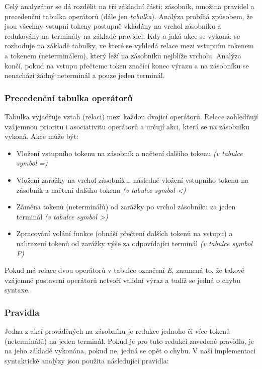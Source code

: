 \documentclass[a4paper,11pt]{article}
\begin{document}
Celý analyzátor se dá rozdělit na tři základní části: zásobník, množina pravidel a precedenční tabulka operátorů (dále jen \textit{tabulka}). Analýza probíhá způsobem, že jsou všechny vstupní tokeny postupně vkládány na vrchol zásobníku a redukovány na terminály na základě pravidel. Kdy a jaká akce se vykoná, se rozhoduje na základě tabulky, ve které se vyhledá relace mezi vstupním tokenem a tokenem (neterminálem), který leží na zásobníku nejblíže vrcholu. Analýza končí, pokud na vstupu přečteme token značící konec výrazu a na zásobníku se nenachází žádný neterminál a pouze jeden terminál.

\subsubsection{Precedenční tabulka operátorů}
Tabulka vyjadřuje vztah (relaci) mezi každou dvojicí operátorů. Relace zohledňují vzájemnou prioritu i asociativitu operátorů a určují akci, která se na zásobníku vykoná. Akce může být: 
\begin{itemize}
   \item Vložení vstupního tokenu na zásobník a načtení dalšího tokenu \textit{(v tabulce symbol =)}
   \item Vložení zarážky na vrchol zásobníku, následné vložení vstupního tokenu na zásobník a načtení dalšího tokenu \textit{(v tabulce symbol \textless)}
   \item Záměna tokenů (neterminálů) od zarážky po vrchol zásobníku za jeden terminál \textit{(v tabulce symbol \textgreater)}
   \item Zpracování volání funkce (obnáší přečtení dalších tokenů na vstupu) a nahrazení tokenů od zarážky výše za odpovídajíci terminál \textit{(v tabulce symbol F)}
\end{itemize}

Pokud má relace dvou operátorů v tabulce označení \textit{E}, znamená to, že takové vzájemné postavení operátorů netvoří validní výraz a tudíž se jedná o chybu syntaxe.

\subsubsection{Pravidla}
Jedna z akcí prováděných na zásobníku je redukce jednoho či více tokenů (neterminálů) na jeden terminál. Pokud je pro tuto redukci zavedené pravidlo, je na jeho základě vykonána, pokud ne, jedná se opět o chybu. V naší implementaci syntaktické analýzy jsou použita následující pravidla:
\end{document}
